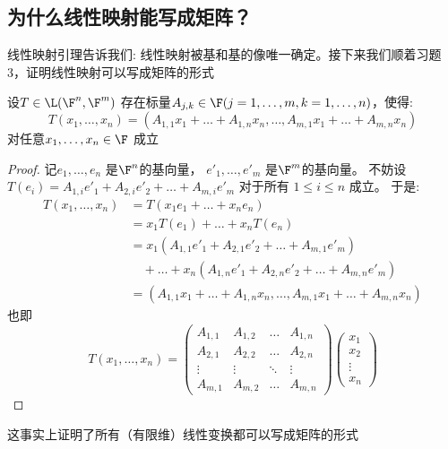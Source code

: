 \subsection{为什么线性映射能写成矩阵？}
线性映射引理告诉我们: 线性映射被基和基的像唯一确定。接下来我们顺着习题3，证明线性映射可以写成矩阵的形式
\begin{theorem}
  设\(T \in \L(\F^{n},\F^{m})\)
  存在标量\(A_{j,k} \in
  \F (j = 1, \dots ,m, k=1, \dots, n) \)，使得:
  \[
    T(x_{1},\dots,x_{n})=(A_{1,1}x_{1}+\dots+A_{1,n}x_{n},\dots,A_{m,1}x_{1}+\dots+A_{m,n}x_{n})
  \]
  对任意\(x_{1},\dots,x_{n} \in \F\) 成立
\end{theorem}

\begin{proof}
  记\(e_{1}, \dots, e_{n}\) 是\(\F^{n}\)的基向量，
  \(e'_{1}, \dots, e'_{m}\)
  是\(\F^{m}\)的基向量。
  不妨设 \(T(e_{i}) = A_{1,i}e'_{1} +
    A_{2,i}e'_{2} + \dots +
  A_{m,i}e'_{m}\) 对于所有 \(1\leq i\leq n\) 成立。
  于是:
  \begin{align*}
    T(x_{1},\dots,x_{n}) &= T(x_{1}e_{1} + \dots +
    x_{n}e_{n})\\
    &= x_{1}T(e_{1}) + \dots + x_{n}T(e_{n})\\
    &= x_{1}(A_{1,1}e'_{1} + A_{2,1}e'_{2} +
    \dots + A_{m,1}e'_{m}) \nonumber \\
    &\quad + \dots +
    x_{n}(A_{1,n}e'_{1} + A_{2,n}e'_{2} +
    \dots + A_{m,n}e'_{m})\\    &=
    (A_{1,1}x_{1}+\dots+A_{1,n}x_{n},\dots,A_{m,1}x_{1}+\dots+A_{m,n}x_{n})
  \end{align*}
  也即\[
    T(x_1, \dots, x_n) =
    \begin{pmatrix}
      A_{1,1} & A_{1,2} & \dots & A_{1,n} \\
      A_{2,1} & A_{2,2} & \dots & A_{2,n} \\
      \vdots  & \vdots  & \ddots & \vdots  \\
      A_{m,1} & A_{m,2} & \dots & A_{m,n}
    \end{pmatrix}
    \begin{pmatrix}
      x_1 \\
      x_2 \\
      \vdots \\
      x_n
    \end{pmatrix}
  \]
\end{proof}
这事实上证明了所有（有限维）线性变换都可以写成矩阵的形式

